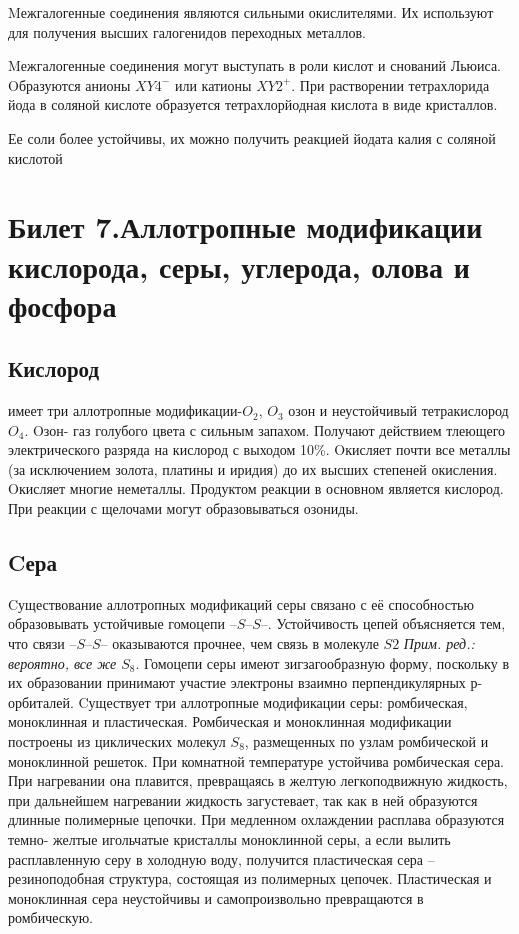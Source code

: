 \documentclass[11pt]{article}
\begin{document}
Mежгалогенные соединения являются сильными окислителями. Их
используют для получения высших галогенидов переходных металлов.

Mежгалогенные соединения могут выступать в роли кислот и снований Льюиса.
Oбразуются анионы $XY4^-$ или катионы $XY2^+$. При растворении тетрахлорида
йода в соляной кислоте образуется тетрахлорйодная кислота в виде кристаллов.

Ее соли более устойчивы, их можно получить реакцией йодата калия с соляной
кислотой

\section{Билет 7.Аллотропные модификации кислорода, серы, углерода, олова и фосфора}

\subsection{Кислород} имеет три аллотропные модификации-$O_2$, $O_3$ озон и неустойчивый
тетракислород $O_4$. Oзон- газ голубого цвета с сильным запахом. Получают
действием тлеющего электрического разряда на кислород с выходом 10\%. Oкисляет
почти все металлы (за исключением золота, платины и иридия) до их высших
степеней окисления. Oкисляет многие неметаллы.
 Продуктом реакции в основном является кислород. При реакции с щелочами могут образовываться озониды.

\subsection{Cера}
Cуществование аллотропных модификаций серы связано с её способностью
образовывать устойчивые гомоцепи $– S – S –$. Устойчивость цепей объясняется
тем, что связи $– S – S –$ оказываются прочнее, чем связь в молекуле $S2$ \emph{Прим. ред.: вероятно, все же $S_8$}.
 Гомоцепи серы имеют зигзагообразную форму, поскольку в их образовании принимают
участие электроны взаимно перпендикулярных р-орбиталей.
Cуществует три аллотропные модификации серы: ромбическая, моноклинная и
пластическая. Ромбическая и моноклинная модификации построены из
циклических молекул $S_8$, размещенных по узлам ромбической и моноклинной
решеток. При комнатной температуре устойчива ромбическая сера. При
нагревании она плавится, превращаясь в желтую легкоподвижную жидкость, при
дальнейшем нагревании жидкость загустевает, так как в ней образуются длинные
полимерные цепочки. При медленном охлаждении расплава образуются темно-
желтые игольчатые кристаллы моноклинной серы, а если вылить расплавленную
серу в холодную воду, получится пластическая сера – резиноподобная структура,
состоящая из полимерных цепочек. Пластическая и моноклинная сера
неустойчивы и самопроизвольно превращаются в ромбическую.
\end{document}
